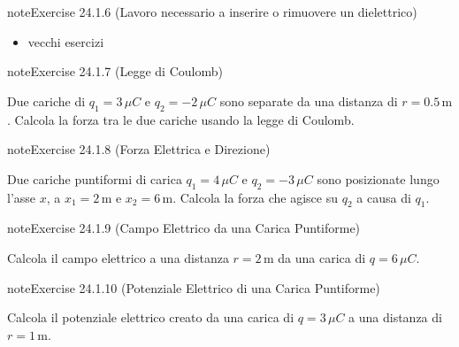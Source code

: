 \documentclass[letterpaper,10pt,italian]{jupyterBook}
\begin{document}
\begin{sphinxadmonition}{note}{Exercise 24.1.6 (Lavoro necessario a inserire o rimuovere un dielettrico)}


\end{sphinxadmonition}
\begin{itemize}
\item {} 
\sphinxAtStartPar
vecchi esercizi

\end{itemize}
 \label{exercise:ch/electromagnetism/electrostatics-problems-exercise-6}

\begin{sphinxadmonition}{note}{Exercise 24.1.7 (Legge di Coulomb)}



\sphinxAtStartPar
Due cariche di \(q_1 = 3 \, \mu C\) e \(q_2 = -2 \, \mu C\) sono separate da una distanza di \(r = 0.5 \, \text{m}\). Calcola la forza tra le due cariche usando la legge di Coulomb.
\end{sphinxadmonition}
 \label{exercise:ch/electromagnetism/electrostatics-problems-exercise-7}

\begin{sphinxadmonition}{note}{Exercise 24.1.8 (Forza Elettrica e Direzione)}



\sphinxAtStartPar
Due cariche puntiformi di carica \(q_1 = 4 \, \mu C\) e \(q_2 = -3 \, \mu C\) sono posizionate lungo l’asse \(x\), a \(x_1 = 2 \, \text{m}\) e \(x_2 = 6 \, \text{m}\). Calcola la forza che agisce su \(q_2\) a causa di \(q_1\).
\end{sphinxadmonition}
 \label{exercise:ch/electromagnetism/electrostatics-problems-exercise-8}

\begin{sphinxadmonition}{note}{Exercise 24.1.9 (Campo Elettrico da una Carica Puntiforme)}



\sphinxAtStartPar
Calcola il campo elettrico a una distanza \(r = 2 \, \text{m}\) da una carica di \(q = 6 \, \mu C\).
\end{sphinxadmonition}
 \label{exercise:ch/electromagnetism/electrostatics-problems-exercise-9}

\begin{sphinxadmonition}{note}{Exercise 24.1.10 (Potenziale Elettrico di una Carica Puntiforme)}



\sphinxAtStartPar
Calcola il potenziale elettrico creato da una carica di \(q = 3 \, \mu C\) a una distanza di \(r = 1 \, \text{m}\).
\end{sphinxadmonition}
 \label{exercise:ch/electromagnetism/electrostatics-problems-exercise-10}
\end{document}
